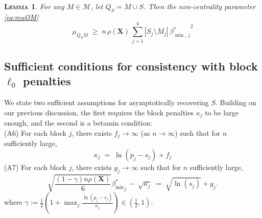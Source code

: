 \documentclass[aos]{imsart}
\theoremstyle{plain}
\newtheorem{lem}[thm]{\textsc{Lemma}}
\newcommand{\M}{\mathcal{M}}
\newcommand{\bs}{\boldsymbol}
\begin{document}
\begin{lem}\label{lem:boundrho}
 For any $M\in\M$, let $Q_S=M \cup S$. Then the non-centrality parameter  \eqref{eq:muQM}
    \begin{equation}\label{eq:musmbound}
    \mu_{Q_SM}\; \geq \;n\,\rho(\bs X)\,\sum_{j=1}^b|S_j\setminus M_j|\,{\beta_{\min,\,j}^*}^2
\end{equation}
\end{lem}



\subsection{Sufficient conditions for consistency with block $\ell_0$ penalties}
\label{ssec:regression_mainresult}

We state two sufficient assumptions for asymptotically recovering $S$. 
Building on our previous discussion, the first requires the block penalties $\kappa_j$ to be large enough,  
and the second is a betamin condition:\\[5pt] 
(A6) \quad For each block $j$, there exists $f_j\to \infty$ (as $n\to \infty$) such that for $n$ sufficiently large,
\begin{equation*}
    \kappa_j \;=\;\ln(p_j-s_j) + f_j
\end{equation*} 
(A7) \quad For each block $j$, there exists $g_j\to \infty$ such that for $n$ sufficiently large,
    \begin{equation*}
        \sqrt{\frac{(1-\gamma) n\rho(\bs X)}{6}}{{\beta_{\min}^*}_j} \,- \,\sqrt{\kappa_j} \;=\; \sqrt{\ln(s_j)} + g_j .
    \end{equation*}
where $\gamma:=\frac12(1+\max_j\frac{\ln(p_j-s_j)}{\kappa_j})\in (\tfrac12,1)$.\\[5pt] 
\end{document}
